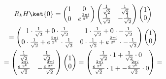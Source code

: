 \documentclass[]{article}
\begin{document}
\begin{enumerate}
\begin{enumerate}
            \begin{gather*}
              R_k H \ket{0} =
              \begin{pmatrix}
                1 & 0\\
                0 & e^{\frac{2\pi i }{2^k}}
              \end{pmatrix}
              \begin{pmatrix}
                \frac{1}{\sqrt{2}} & \frac{1}{\sqrt{2}} \\
                \frac{1}{\sqrt{2}} & -\frac{1}{\sqrt{2}} 
              \end{pmatrix}
              \begin{pmatrix}
                1\\
                0
              \end{pmatrix}\\
              = \begin{pmatrix}
                1 \cdot \frac{1}{\sqrt{2}} + 0 \cdot \frac{1}{\sqrt{2}} & 
                1 \cdot \frac{1}{\sqrt{2}} + 0 \cdot - \frac{1}{\sqrt{2}}\\
                0 \cdot \frac{1}{\sqrt{2}} + e^{\frac{2 \pi i}{2^k}} \cdot \frac{1}{\sqrt{2}} &
                0 \cdot \frac{1}{\sqrt{2}} + e^{\frac{2 \pi i}{2^k}} \cdot - \frac{1}{\sqrt{2}}
              \end{pmatrix} 
              \begin{pmatrix}
                1\\
                0
              \end{pmatrix}\\
              = \begin{pmatrix}
                \frac{1}{\sqrt{2}} & \frac{1}{\sqrt{2}}\\
                \frac{e^{\frac{2 \pi i}{2^k}}}{\sqrt{2}} &  - \frac{e^{\frac{2 \pi i}{2^k}}}{\sqrt{2}}
              \end{pmatrix}
              \begin{pmatrix}
                1\\
                0
              \end{pmatrix} = 
              \begin{pmatrix}
                \frac{1}{\sqrt{2}} \cdot 1 + \frac{1}{\sqrt{2}} \cdot 0\\
                \frac{e^{\frac{2 \pi i}{2^k}}}{\sqrt{2}} \cdot 1 + - \frac{e^{\frac{2 \pi i}{2^k}}}{\sqrt{2}} \cdot 0
              \end{pmatrix} = 

\end{gather*}
\end{enumerate}
\end{enumerate}
\end{document}
